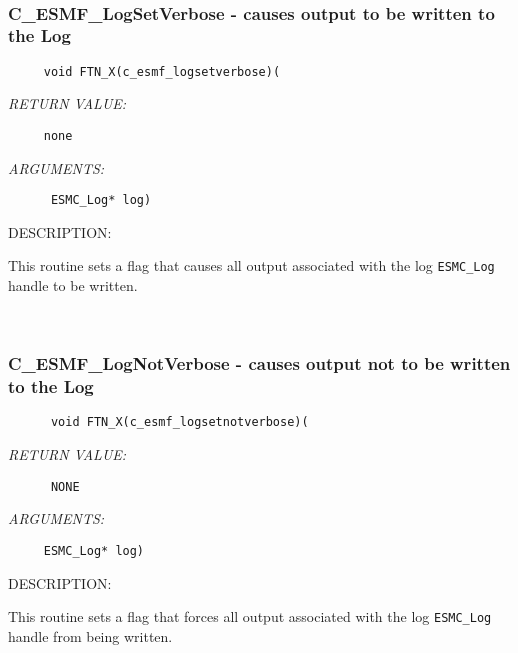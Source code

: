  
\mbox{}\hrulefill\ 
 
\subsubsection [C\_ESMF\_LogSetVerbose] {C\_ESMF\_LogSetVerbose - causes output to be written to the Log}


  
\begin{verbatim}     void FTN_X(c_esmf_logsetverbose)(\end{verbatim}{\em RETURN VALUE:}
\begin{verbatim}     none\end{verbatim}{\em ARGUMENTS:}
\begin{verbatim}      ESMC_Log* log)\end{verbatim}
{\sf DESCRIPTION:\\ }


      This routine sets a flag that causes all output associated with
      the log {\tt ESMC\_Log} handle to be written. 
 
\mbox{}\hrulefill\ 
 
\subsubsection [C\_ESMF\_LogNotVerbose] {C\_ESMF\_LogNotVerbose - causes output not to be written to the Log}


                         
\begin{verbatim}      void FTN_X(c_esmf_logsetnotverbose)(\end{verbatim}{\em RETURN VALUE:}
\begin{verbatim}      NONE\end{verbatim}{\em ARGUMENTS:}
\begin{verbatim}     ESMC_Log* log) \end{verbatim}
{\sf DESCRIPTION:\\ }


      This routine sets a flag that forces all output associated with
      the log {\tt ESMC\_Log} handle from being written. 
 
\mbox{}\hrulefill\ 
 

